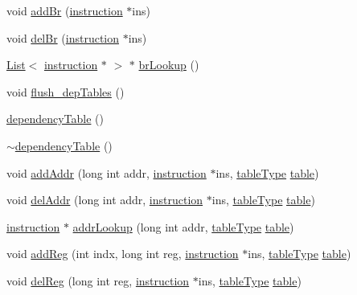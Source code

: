 \begin{DoxyCompactItemize}
\item 
void \hyperlink{classdependencyTable_a68cb3b1cdf38c24d1bfd5913112f6f24}{addBr} (\hyperlink{classinstruction}{instruction} $\ast$ins)
\item 
void \hyperlink{classdependencyTable_a6b94d787b12a3979b8b182c7e5bde07f}{delBr} (\hyperlink{classinstruction}{instruction} $\ast$ins)
\item 
\hyperlink{classList}{List}$<$ \hyperlink{classinstruction}{instruction} $\ast$ $>$ $\ast$ \hyperlink{classdependencyTable_a7896f0b48411dcb469ebb2647b84541c}{brLookup} ()
\item 
void \hyperlink{classdependencyTable_a8ce45687a518285a6ff32081b8d44125}{flush\_\-depTables} ()
\item 
\hyperlink{classdependencyTable_abae7a5ee69f34dfca3d0b1195b773225}{dependencyTable} ()
\item 
\hyperlink{classdependencyTable_a0b227c520264190bae8782e4f9db593a}{$\sim$dependencyTable} ()
\item 
void \hyperlink{classdependencyTable_a2152aa2490daef06772595e126e6e024}{addAddr} (long int addr, \hyperlink{classinstruction}{instruction} $\ast$ins, \hyperlink{backend_2dependencyTable_8h_ab390e08ed69004340ece1f911f48fd1b}{tableType} \hyperlink{classtable}{table})
\item 
void \hyperlink{classdependencyTable_abffec553d72068c891beb9fa8fe73440}{delAddr} (long int addr, \hyperlink{classinstruction}{instruction} $\ast$ins, \hyperlink{backend_2dependencyTable_8h_ab390e08ed69004340ece1f911f48fd1b}{tableType} \hyperlink{classtable}{table})
\item 
\hyperlink{classinstruction}{instruction} $\ast$ \hyperlink{classdependencyTable_a2f5a21dac633c810831e4759445d7c47}{addrLookup} (long int addr, \hyperlink{backend_2dependencyTable_8h_ab390e08ed69004340ece1f911f48fd1b}{tableType} \hyperlink{classtable}{table})
\item 
void \hyperlink{classdependencyTable_a09e8df2809062b427a8ff3494ecb853d}{addReg} (int indx, long int reg, \hyperlink{classinstruction}{instruction} $\ast$ins, \hyperlink{backend_2dependencyTable_8h_ab390e08ed69004340ece1f911f48fd1b}{tableType} \hyperlink{classtable}{table})
\item 
void \hyperlink{classdependencyTable_a6057fc845371e5846048e7c7ede21cd8}{delReg} (long int reg, \hyperlink{classinstruction}{instruction} $\ast$ins, \hyperlink{backend_2dependencyTable_8h_ab390e08ed69004340ece1f911f48fd1b}{tableType} \hyperlink{classtable}{table})
\item 

\end{DoxyCompactItemize}
